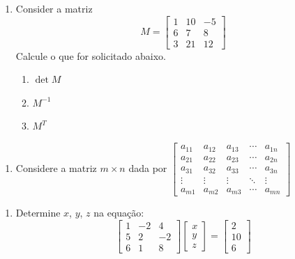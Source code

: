\documentclass[a4paper,12pt]{article}
\begin{document}
   \begin{enumerate}
      \item Consider a matriz $$M= \begin{bmatrix}
      1&10& -5\\6&7&8\\3&21&12
      \end{bmatrix}$$Calcule o que for solicitado abaixo.
      \begin{enumerate}
         \item $\det M$
         \item $M^{-1}$
         \item $M^T$
      \end{enumerate}
   \end{enumerate}
   \begin{enumerate}
      \item Considere a matriz $m\times n$ dada por $\begin{bmatrix}
      a_{11} & a_{12} & a_{13} & \cdots & a_{1n} \\ a_{21} & a_{22} & a_{23} & \cdots & a_{2n} \\ a_{31} & a_{32} & a_{33} & \cdots & a_{3n} \\ \vdots & \vdots & \vdots & \ddots & \vdots \\ a_{m1} & a_{m2} & a_{m3} & \cdots & a_{mn}  
      \end{bmatrix}$
   \end{enumerate}
   \begin{enumerate}
      \item Determine $x$, $y$, $z$ na equação: $$\begin{bmatrix}
      1& -2&4\\5&2& -2\\ 6&1&8
      \end{bmatrix}
      \begin{bmatrix}
         x \\ y \\ z
      \end{bmatrix}=
      \begin{bmatrix}
        2\\ 10\\ 6
      \end{bmatrix}$$
   \end{enumerate}
\end{document}
